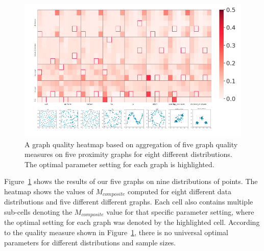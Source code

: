 \begin{figure}[!ht]
  \includegraphics[width=\linewidth]{figs/chap7/Combined5graphs.png}
  \caption{A graph quality heatmap based on aggregation of five graph quality measures on five proximity graphs for eight different distributions.
  The optimal parameter setting for each graph is highlighted.}
  \label{fig:teaser}
\end{figure}

Figure~\ref{fig:teaser} shows the results of our five graphs on nine distributions of points.
%
The heatmap shows the values of $M_{composite}$ computed for eight different data distributions and five different different graphs.
%
Each cell also contains multiple sub-cells denoting the  $M_{composite}$ value for that specific parameter setting, where the optimal setting for each graph was denoted by the highlighted cell.
%
According to the quality measure shown in Figure~\ref{fig:teaser}, there is no universal optimal parameters for different distributions and sample sizes.

